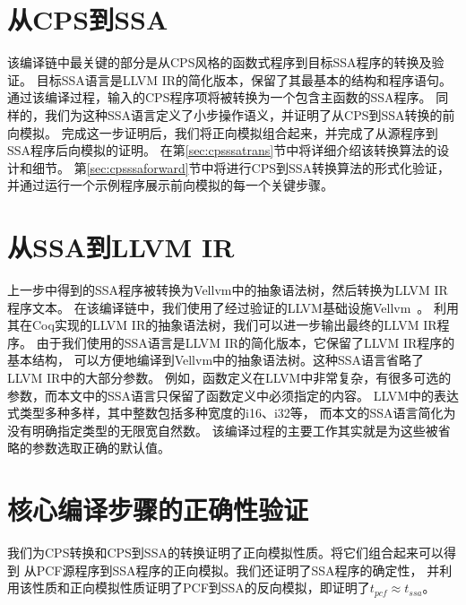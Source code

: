 \section{从CPS到SSA}

该编译链中最关键的部分是从CPS风格的函数式程序到目标SSA程序的转换及验证。
目标SSA语言是LLVM IR的简化版本，保留了其最基本的结构和程序语句。
通过该编译过程，输入的CPS程序项将被转换为一个包含主函数的SSA程序。
同样的，我们为这种SSA语言定义了小步操作语义，并证明了从CPS到SSA转换的前向模拟。
完成这一步证明后，我们将正向模拟组合起来，并完成了从源程序到SSA程序后向模拟的证明。
在第\ref{sec:cpsssatrans}节中将详细介绍该转换算法的设计和细节。
第\ref{sec:cpsssaforward}节中将进行CPS到SSA转换算法的形式化验证，并通过运行一个示例程序展示前向模拟的每一个关键步骤。

\section{从SSA到LLVM IR}

上一步中得到的SSA程序被转换为Vellvm中的抽象语法树，然后转换为LLVM IR程序文本。
在该编译链中，我们使用了经过验证的LLVM基础设施Vellvm~\cite{zakowski2021modular}。
利用其在Coq实现的LLVM IR的抽象语法树，我们可以进一步输出最终的LLVM IR程序。
由于我们使用的SSA语言是LLVM IR的简化版本，它保留了LLVM IR程序的基本结构，
可以方便地编译到Vellvm中的抽象语法树。这种SSA语言省略了LLVM IR中的大部分参数。
例如，函数定义在LLVM中非常复杂，有很多可选的参数，而本文中的SSA语言只保留了函数定义中必须指定的内容。
LLVM中的表达式类型多种多样，其中整数包括多种宽度的i16、i32等，
而本文的SSA语言简化为没有明确指定类型的无限宽自然数。
该编译过程的主要工作其实就是为这些被省略的参数选取正确的默认值。

\section{核心编译步骤的正确性验证}

我们为CPS转换和CPS到SSA的转换证明了正向模拟性质。将它们组合起来可以得到
从PCF源程序到SSA程序的正向模拟。我们还证明了SSA程序的确定性，
并利用该性质和正向模拟性质证明了PCF到SSA的反向模拟，即证明了$t_{pcf}\approx t_{ssa}$。

